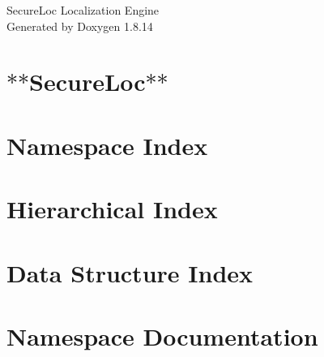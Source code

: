 \documentclass[twoside]{book}
\newcommand{\+}{\discretionary{\mbox{\scriptsize$\hookleftarrow$}}{}{}}
\newcommand{\clearemptydoublepage}{%
  \newpage{\pagestyle{empty}\cleardoublepage}%
}
\begin{document}
\hypersetup{pageanchor=false,
             bookmarksnumbered=true,
             pdfencoding=unicode
            }
\begin{titlepage}
\vspace*{7cm}
\begin{center}%
{\Large Secure\+Loc Localization Engine }\\
\vspace*{1cm}
{\large Generated by Doxygen 1.8.14}\\
\end{center}
\end{titlepage}
\clearemptydoublepage
{}
\tableofcontents
\clearemptydoublepage
{}
\hypersetup{pageanchor=true}

\chapter{$\ast$$\ast$\+Secure\+Loc$\ast$$\ast$}
\label{md__c_1__users_pestourb__documents__git_hub__secure_loc__r_e_a_d_m_e}

\chapter{Namespace Index}

\chapter{Hierarchical Index}

\chapter{Data Structure Index}

\chapter{Namespace Documentation}

















\end{document}
